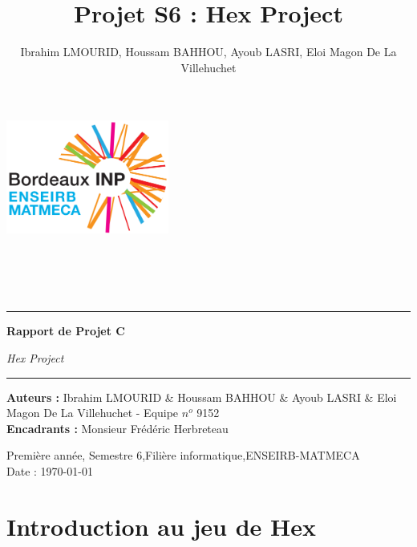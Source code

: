 \documentclass[a4paper,10pt]{article}
\begin{document}
\pagestyle{fancy}
\rhead{\thepage}
\lfoot{}
\cfoot{}
\rfoot{}


\title{Projet S6 : Hex Project }
\author{Ibrahim LMOURID, Houssam BAHHOU, Ayoub LASRI, Eloi Magon De La Villehuchet}


\label{sec:title}
\thispagestyle{empty}


\includegraphics[width=0.4\textwidth]{Logo.png}
\\
\\
\\
\\
\\
\noindent\rule{\textwidth}{1pt}
\begin{flushright}
  \Huge
  \textbf{Rapport de Projet C}

    \vspace{15pt}
  \large 
  \textsl{Hex Project }

\end{flushright}
\noindent\rule{\textwidth}{1pt}


\large
\noindent\textbf{Auteurs   : }  \textup{Ibrahim LMOURID \& Houssam BAHHOU \& Ayoub LASRI \& Eloi Magon De La Villehuchet - Equipe $n^{o}$ 9152 } \\
\noindent\textbf{Encadrants :} \textup{ Monsieur Frédéric Herbreteau }

\normalsize
\begin{center}
  Première année, Semestre 6,Filière informatique,ENSEIRB-MATMECA\\
  Date : \today
\end{center}



\newpage
\tableofcontents

\newpage
\section{Introduction au jeu de Hex}
\end{document}
